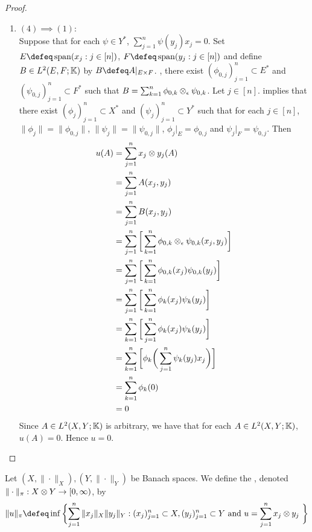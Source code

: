 \documentclass{book}
\begin{document}
\begin{proof}
\begin{enumerate}
		\item $(4) \implies (1)$: \\
		Suppose that for each $\psi \in Y^*$, $\sum\limits_{j=1}^n  \psi(y_j) x_j = 0$. Set $E \defeq \spn(x_j:j \in [n])$, $F \defeq \spn(y_j:j \in [n])$ and define $B \in L^2(E , F; \mathbb{K})$ by $B \defeq A|_{E \times F}$. , there exist $(\phi_{0,j})_{j=1}^n \subset E^*$ and $(\psi_{0,j})_{j=1}^n \subset F^*$ such that $B = \sum_{k=1}^n \phi_{0,k} \otimes_{\epsilon} \psi_{0,k}$. Let $j \in [n]$.  implies that there exist $(\phi_j)_{j=1}^n \subset X^*$ and $(\psi_j)_{j=1}^n \subset Y^*$ such that for each $j \in [n]$, $\|\phi_j\| = \|\phi_{0,j}\|$, $\|\psi_j\| = \|\psi_{0,j}\|$, $\phi_j|_E = \phi_{0, j}$ and $\psi_j|_F = \psi_{0, j}$. Then
		\begin{align*}
			u(A)
			& = \sum_{j=1}^n x_j \otimes y_j(A) \\
			& = \sum_{j=1}^n A(x_j, y_j) \\
			& = \sum_{j=1}^n B(x_j, y_j) \\
			& = \sum_{j = 1}^n \bigg[ \sum_{k=1}^n \phi_{0,k} \otimes_{\epsilon} \psi_{0,k}(x_j, y_j) \bigg] \\
			& = \sum_{j = 1}^n \bigg[ \sum_{k=1}^n \phi_{0,k}(x_j)\psi_{0,k}(y_j) \bigg] \\
			& = \sum_{j = 1}^n \bigg[ \sum_{k=1}^n \phi_k(x_j)\psi_k(y_j) \bigg] \\
			& = \sum_{k = 1}^n \bigg[ \sum_{j=1}^n \phi_k(x_j)\psi_k(y_j) \bigg] \\
			& = \sum_{k=1}^n \bigg[ \phi_k \bigg( \sum_{j = 1}^n \psi_k(y_j) x_j \bigg) \bigg] \\ 
			& = \sum_{k=1}^n \phi_k(0) \\
			& = 0
		\end{align*}
		Since $A \in L^2(X,Y;\mathbb{K})$ is arbitrary, we have that for each $A \in L^2(X,Y;\mathbb{K})$, $u(A) = 0$. Hence $u = 0$.
	\end{enumerate}
\end{proof}

\begin{defn} 
	Let $(X, \| \cdot \|_X), (Y, \| \cdot \|_Y)$ be Banach spaces. We define the , denoted $\|\cdot\|_{\pi}: X \otimes Y \rightarrow [0,\infty)$, by 
	$$\|u \|_{\pi} \defeq \inf \bigg\{ \text{$\sum_{j=1}^n \|x_j\|_X \|y_j\|_Y : (x_j)_{j=1}^n \subset X, (y_j)_{j=1}^n \subset Y $ and $u = \sum_{j=1}^n x_j \otimes y_j$ }\bigg\}$$ 
\end{defn}
\end{document}
